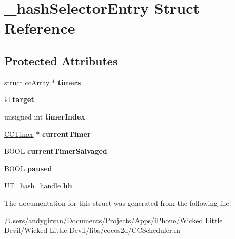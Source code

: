 \hypertarget{struct__hash_selector_entry}{\section{\-\_\-hash\-Selector\-Entry Struct Reference}
\label{struct__hash_selector_entry}
}
\subsection*{Protected Attributes}
\begin{DoxyCompactItemize}
\item 
\hypertarget{struct__hash_selector_entry_a7cad3c011280d8c3a395f194e36fefb4}{struct \hyperlink{structcc_array}{cc\-Array} $\ast$ {\bfseries timers}}\label{struct__hash_selector_entry_a7cad3c011280d8c3a395f194e36fefb4}

\item 
\hypertarget{struct__hash_selector_entry_a46cc9aaa4ae05b65224a2bd8b15cdbf0}{id {\bfseries target}}\label{struct__hash_selector_entry_a46cc9aaa4ae05b65224a2bd8b15cdbf0}

\item 
\hypertarget{struct__hash_selector_entry_a59097dfb75a2371b892cf2a25e041bd1}{unsigned int {\bfseries timer\-Index}}\label{struct__hash_selector_entry_a59097dfb75a2371b892cf2a25e041bd1}

\item 
\hypertarget{struct__hash_selector_entry_a64fd6872d164829d7d469226847ffcd3}{\hyperlink{interface_c_c_timer}{C\-C\-Timer} $\ast$ {\bfseries current\-Timer}}\label{struct__hash_selector_entry_a64fd6872d164829d7d469226847ffcd3}

\item 
\hypertarget{struct__hash_selector_entry_a5f3cb2fe87f25e7e2cc457cd2d265044}{B\-O\-O\-L {\bfseries current\-Timer\-Salvaged}}\label{struct__hash_selector_entry_a5f3cb2fe87f25e7e2cc457cd2d265044}

\item 
\hypertarget{struct__hash_selector_entry_a9058fa6e516eaf9df642e482c5a88dcf}{B\-O\-O\-L {\bfseries paused}}\label{struct__hash_selector_entry_a9058fa6e516eaf9df642e482c5a88dcf}

\item 
\hypertarget{struct__hash_selector_entry_ad007cfdf3a7df8672a9c6901e70c97ea}{\hyperlink{struct_u_t__hash__handle}{U\-T\-\_\-hash\-\_\-handle} {\bfseries hh}}\label{struct__hash_selector_entry_ad007cfdf3a7df8672a9c6901e70c97ea}

\end{DoxyCompactItemize}


The documentation for this struct was generated from the following file\-:\begin{DoxyCompactItemize}
\item 
/\-Users/andygirvan/\-Documents/\-Projects/\-Apps/i\-Phone/\-Wicked Little Devil/\-Wicked Little Devil/libs/cocos2d/C\-C\-Scheduler.\-m\end{DoxyCompactItemize}
